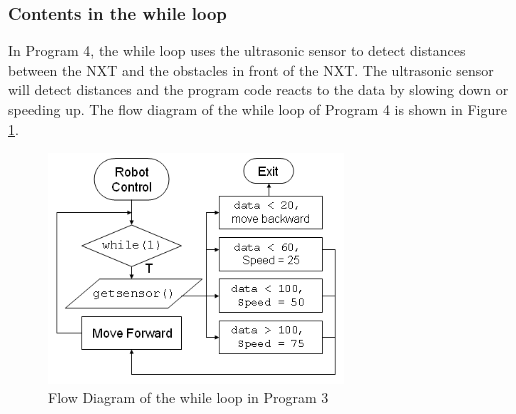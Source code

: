 \documentclass[12pt]{article}
\begin{document}
\subsubsection*{Contents in the while loop}
In Program 4, the while loop uses the ultrasonic sensor to detect distances between the NXT and the obstacles in 
front of the NXT. The ultrasonic sensor will detect distances and the program code reacts to the data by slowing 
down or speeding up. The flow diagram of the while loop of Program 4 is shown in Figure \ref{fig_NXT_ultraflow}.
\begin{figure}[h]
  \begin{center}
    \includegraphics[height=2.4in]{figure/mindstorm/NXT_ultraflow.png}
    \caption{Flow Diagram of the while loop in Program 3 \label{fig_NXT_ultraflow}}
  \end{center}
\end{figure}
\end{document}
